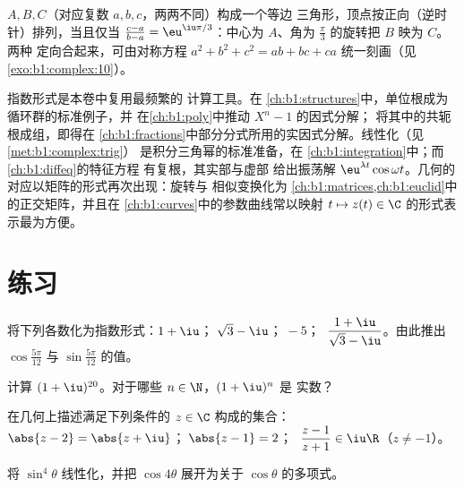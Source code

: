 \begin{example}\label{ex:b1:complex:equilateral}
$A, B, C$（对应复数 $a, b, c$，两两不同）构成一个等边
三角形，顶点按正向（逆时针）排列，当且仅当
$\frac{c - a}{b - a} = \eu^{\iu\pi/3}$：中心为
$A$、角为 $\frac\pi3$ 的旋转把 $B$ 映为 $C$。两种
定向合起来，可由对称方程 $a^2 + b^2 + c^2 = ab
+ bc + ca$ 统一刻画（见\cref{exo:b1:complex:10}）。
\end{example}

\begin{remark}[本章的应用]\label{rem:b1:complex:whereused}
指数形式是本卷中复用最频繁的
计算工具。在
\cref{ch:b1:structures}中，单位根成为循环群的标准例子，并
在\cref{ch:b1:poly}中推动 $X^n - 1$ 的因式分解；
将其中的共轭根成组，即得在
\cref{ch:b1:fractions}中部分分式所用的实因式分解。线性化（见\cref{met:b1:complex:trig}）
是积分三角幂的标准准备，在
\cref{ch:b1:integration}中；而\cref{ch:b1:diffeq}的特征方程
有复根，其实部与虚部
给出振荡解 $\eu^{\lambda t}\cos\omega
t$。几何的对应以矩阵的形式再次出现：旋转与
相似变换化为
\cref{ch:b1:matrices,ch:b1:euclid}中的正交矩阵，并且在
\cref{ch:b1:curves}中的参数曲线常以映射 $t \mapsto z(t)
\in \C$ 的形式表示最为方便。
\end{remark}

\section{练习}

\begin{exercise}[$\star$]\label{exo:b1:complex:1}
将下列各数化为指数形式：$1 + \iu$；$\;\sqrt 3 - \iu$；$\;-5$；
$\;\dfrac{1 + \iu}{\sqrt 3 - \iu}$。由此推出
$\cos\frac{5\pi}{12}$ 与 $\sin\frac{5\pi}{12}$ 的值。
\end{exercise}

\begin{exercise}[$\star$]\label{exo:b1:complex:2}
计算 $(1 + \iu)^{20}$。对于哪些 $n \in \N$，$(1 + \iu)^n$ 是
实数？
\end{exercise}

\begin{exercise}[$\star$]\label{exo:b1:complex:3}
在几何上描述满足下列条件的 $z \in \C$ 构成的集合：
$\abs{z - 2} = \abs{z + \iu}$；$\;\abs{z - 1} = 2$；
$\;\dfrac{z - 1}{z + 1} \in \iu\R$（$z \neq -1$）。
\end{exercise}

\begin{exercise}[$\star$]\label{exo:b1:complex:4}
将 $\sin^4\theta$ 线性化，并把 $\cos 4\theta$ 展开为关于
$\cos\theta$ 的多项式。
\end{exercise}

